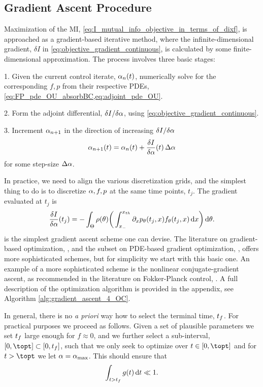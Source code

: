 \subsection{Gradient Ascent Procedure}
\label{sec:gradient_ascent}
Maximization of the MI,
\cref{eq:I_mutual_info_objective_in_terms_of_dixf}, is approached as a
gradient-based iterative method, where the 
infinite-dimensional gradient, $\delta I$ in
\cref{eq:objective_gradient_continuous}, is calculated by some finite-dimensional
approximation. 
The process involves three basic stages:

1. Given the current control iterate, $\alpha_n(t)$, numerically solve for the
  corresponding $f,p$ from their respective PDEs,
  \cref{eq:FP_pde_OU_absorbBC,eq:adjoint_pde_OU}.

2. Form the adjoint differential,
  $\delta I / \delta \alpha$, using
  \cref{eq:objective_gradient_continuous}.

3. Increment $\alpha_{n+1}$ in the direction of increasing $\delta I / \delta
  \alpha$
  \begin{equation}
\alpha_{n+1}(t) = \alpha_n(t) + \frac {\delta I }{\delta \alpha} (t) \, \Delta \alpha
\label{eq:simple_gradient_ascent_increment}
\end{equation}
for some step-size $\Delta \alpha$.

In practice, we need to align the various discretization grids, and the simplest
thing to do is to discretize $\alpha,f,p$ at the same time points, $t_j$.
The gradient evaluated at $t_j$ is $$ 
\frac {\delta I }{\delta \alpha}(t_j) =   
	-\int_\Theta  \rho({ \theta})  \bigg(  
	\int_{ x_{-} }^{{ x_{th} }} {\partial}_x p_{ \theta}(t_j,x) f_{ \theta}(t_j,x) \, \mathrm{d} x    
	    \bigg) \, \mathrm{d} { \theta}.
$$
 is the simplest gradient ascent
scheme one can devise. The literature on gradient-based optimization,
\cite{Nocedal1999}, and the subset on PDE-based gradient optimization,
\cite{Borzi2012}, offers more sophisticated schemes, but for simplicity
we start with this basic one. An example of a more sophisticated scheme
is the nonlinear conjugate-gradient ascent, as recommended in the literature on
Fokker-Planck control, \cite{Annunziato2013}.
 A full description of the optimization algorithm is provided in the appendix, see
Algorithm \ref{alg:gradient_ascent_4_OC}.

In general, there is no {\sl a priori} way how to select the terminal
time, ${ t_f }$. 
For practical purposes we proceed as follows. Given a set of plausible
parameters we set ${ t_f }$ large enough for $f\approx 0$, and we further select a sub-interval,
$[0, \topt] \subset [0, \tf]$, such that we only seek to optimize over $t\in
[0, \topt]$ and for $t > \topt$ we let $\alpha= { \alpha_{\textrm{max}} }$. This should ensure
that $$\int_{t>{ t_f }} g(t) \, \mathrm{d} t 
\ll 1.$$


